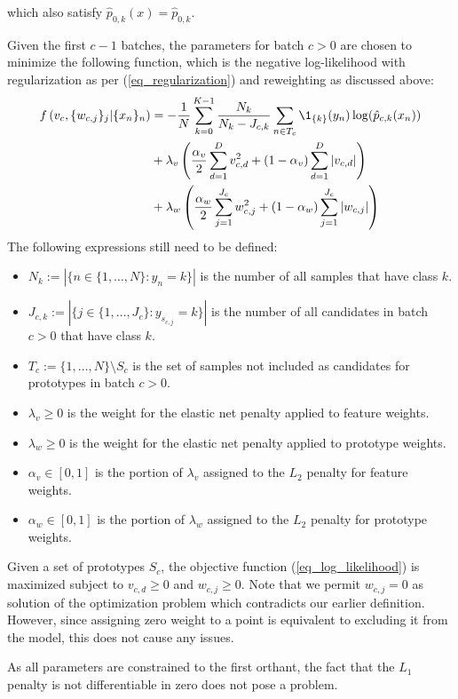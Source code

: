 %
which also satisfy $\hat{p}_{0,k}(x)=\hat{p}_{0,k}$.\par
%
Given the first $c-1$ batches, the parameters for batch $c>0$ are chosen to minimize the following function, which is the negative log-likelihood with regularization as per (\ref{eq_regularization}) and reweighting as discussed above:
%
\begin{align}
f\left(v_c,\{w_{c,j}\}_j|\{x_n\}_n\right)
&=-\frac{1}{N}\sum_{k=0}^{K-1}\frac{N_k}{N_k-J_{c,k}}\sum_{n\in T_c}
\1_{\{k\}}(y_n)\log(\hat{p}_{c,k}(x_n))\label{eq_log_likelihood}\\
&+\lambda_v\left(\frac{\alpha_v}{2}\sum_{d=1}^Dv_{c,d}^2
+(1-\alpha_v)\sum_{d=1}^D|v_{c,d}|\right)\notag\\
&+\lambda_w\left(\frac{\alpha_w}{2}\sum_{j=1}^{J_c}w_{c,j}^2
+(1-\alpha_w)\sum_{j=1}^{J_c}|w_{c,j}|\right)\notag
\end{align}
%
The following expressions still need to be defined:
%
\begin{itemize}
\item $N_k:=\left|\{n\in\{1,\dots,N\}:y_n=k\}\right|$ is the number of all samples that have class $k$.
%
\item $J_{c,k}:=\left|\{j\in\{1,\dots,J_c\}:y_{s_{c,j}}=k\}\right|$
is the number of all candidates in batch $c>0$ that have class $k$.
%
\item $T_c:=\{1,\dots,N\}\setminus S_c$ is the set of samples not included as candidates for prototypes in batch $c>0$.
%
\item $\lambda_v\geq0$ is the weight for the elastic net penalty applied to feature weights.
%
\item $\lambda_w\geq0$ is the weight for the elastic net penalty applied to prototype weights.
%
\item $\alpha_v\in[0,1]$ is the portion of $\lambda_v$ assigned to the $L_2$ penalty for feature weights.
%
\item $\alpha_w\in[0,1]$ is the portion of $\lambda_w$ assigned to the $L_2$ penalty for prototype weights.
\end{itemize}
%
Given a set of prototypes $S_c$, the objective function (\ref{eq_log_likelihood}) is maximized subject to $v_{c,d}\geq0$ and $w_{c,j}\geq0$.
Note that we permit $w_{c,j}=0$ as solution of the optimization problem which contradicts our earlier definition.
However, since assigning zero weight to a point is equivalent to excluding it from the model, this does not cause any issues.\par
%
As all parameters are constrained to the first orthant, the fact that the $L_1$ penalty is not differentiable in zero does not pose a problem.
